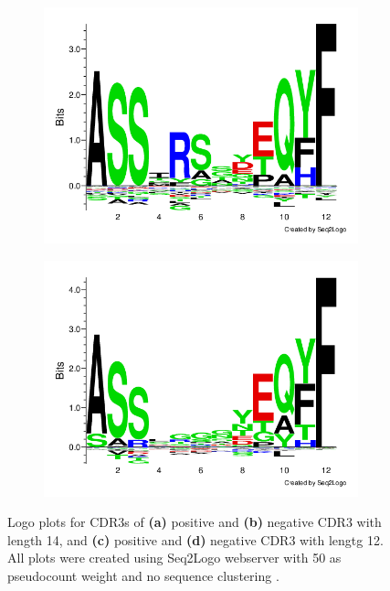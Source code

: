 \begin{figure}[H]
\begin{subfigure}[b]{0.45\textwidth}
   \caption{}
   \label{fig:logo_cdr3aneg}
\end{subfigure}
\begin{subfigure}[b]{0.45\textwidth}
   \includegraphics[width=\textwidth]{figures/seq2logo_cdr3b12mer.png}
   \caption{}
   \label{fig:logo_cdr3bpos}
\end{subfigure}
\begin{subfigure}[b]{0.45\textwidth}
   \includegraphics[width=\textwidth]{figures/seq2logo_neg_12mer.png}
   \caption{}
   \label{fig:logo_cdr3bneg}
\end{subfigure}
\caption{Logo plots for CDR3s of \textbf{(a)} positive and \textbf{(b)} negative CDR3{\textalpha} with length 14, and \textbf{(c)} positive and \textbf{(d)} negative CDR3{\textbeta} with lengtg 12. All plots were created using Seq2Logo webserver with 50 as pseudocount weight and no sequence clustering \cite{Thomsen2012Seq2Logo:Depletion}.}
\label{fig:seqlogos}
\end{figure}

